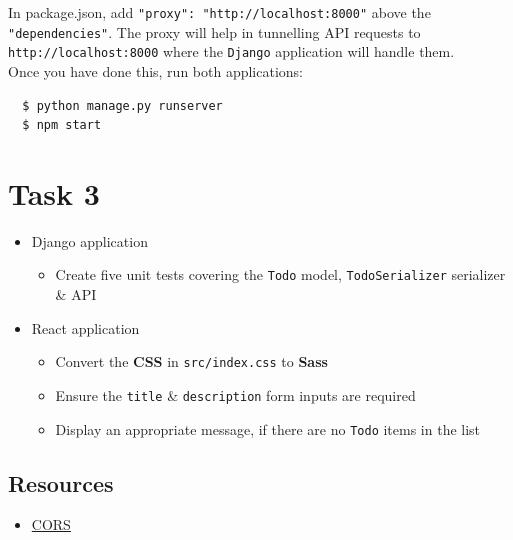 \documentclass{article}
\begin{document}
In package.json, add \texttt{"proxy": "http://localhost:8000"} above the \texttt{"dependencies"}. The proxy will help in tunnelling API requests to \texttt{http://localhost:8000} where the \texttt{Django} application will handle them. \\

Once you have done this, run both applications:

\begin{verbatim}
  $ python manage.py runserver
  $ npm start
\end{verbatim}

\section*{Task 3} 
\begin{itemize}
  \item Django application
  \begin{itemize}
    \item Create five unit tests covering the \texttt{Todo} model, \texttt{TodoSerializer} serializer \& API
  \end{itemize}
  \item React application
  \begin{itemize}
    \item Convert the \textbf{CSS} in \texttt{src/index.css} to \textbf{Sass}
    \item Ensure the \texttt{title} \& \texttt{description} form inputs are required
    \item Display an appropriate message, if there are no \texttt{Todo} items in the list
  \end{itemize}
\end{itemize} 

\subsection*{Resources} 
\begin{itemize}
  \item \href{https://developer.mozilla.org/en-US/docs/Web/HTTP/CORS}{CORS}
\end{itemize}
 
\end{document}
